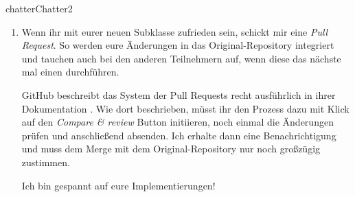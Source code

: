 \documentclass[parskip=half, final]{scrreprt}
\begin{document}
\begin{lecture}
\begin{exc}
\begin{excitem}{chatter}{Chatter}{2}
\begin{enumerate}[label=\roman*.]
\begin{shcode}
git push origin master
\end{shcode}

\item Wenn ihr mit eurer neuen  Subklasse zufrieden sein, schickt mir eine \emph{Pull Request}. So werden eure Änderungen in das Original-Repository integriert und tauchen auch bei den anderen Teilnehmern auf, wenn diese das nächste mal einen  durchführen.

GitHub beschreibt das System der Pull Requests recht ausführlich in ihrer Dokumentation . Wie dort beschrieben, müsst ihr den Prozess dazu mit Klick auf den \emph{Compare \& review} Button initiieren, noch einmal die Änderungen prüfen und anschließend absenden. Ich erhalte dann eine Benachrichtigung und muss dem Merge mit dem Original-Repository nur noch großzügig zustimmen.

Ich bin gespannt auf eure Implementierungen!

\end{enumerate}

\end{excitem}

\end{exc}


\end{lecture}
\end{document}
